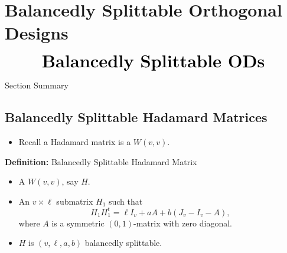\documentclass{beamer}
\begin{document}

  


\section{Balancedly Splittable Orthogonal Designs}

\begin{frame}
  \[
    \text{\huge\bf Balancedly Splittable ODs}
  \]
\end{frame}

\begin{frame}{Section Summary}
  \tableofcontents[sections={2}]
\end{frame}


\subsection{Balancedly Splittable Hadamard Matrices}

\begin{frame}

  \begin{itemize}
  \item Recall a Hadamard matrix is a $W(v,v)$.
  \end{itemize}

  \begin{block}{{\bf Definition:} Balancedly Splittable Hadamard Matrix \cite[][]{splittable-hadamard}}
    \begin{itemize}
    \item A $W(v,v)$, say $H$.
    \item An $v \times \ell$ submatrix $H_1$ such that
      \[
        H_1H_1^t = \ell I_v + aA + b(J_v-I_v-A),
      \]
      where $A$ is a symmetric $(0,1)$-matrix with zero diagonal.
    \item $H$ is $(v,\ell,a,b)$ balancedly splittable.
    \end{itemize}
  \end{block}
  
\end{frame}
\end{document}
